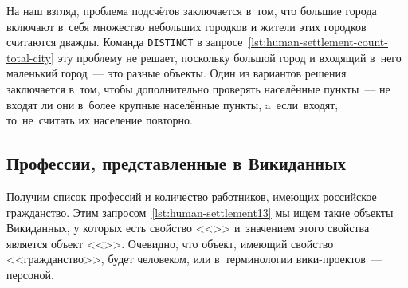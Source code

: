 На наш взгляд, проблема подсчётов заключается в~том, 
что большие города включают в~себя множество небольших городков и жители этих городков считаются дважды. 
Команда \lstinline|DISTINCT|%
%
%
%
%
в запросе~\ref{lst:human-settlement-count-total-city} 
эту проблему не решает, поскольку большой город и входящий в~него маленький город~--- это разные объекты. 
Один из вариантов решения заключается в~том, 
чтобы дополнительно проверять населённые пункты~---  
не входят ли они в~более крупные населённые пункты, 
a~если~входят, то~не~считать их население повторно. 



\subsection{Профессии, представленные в Викиданных}

Получим список профессий и количество работников, 
имеющих российское гражданство. 
Этим запросом~\ref{lst:human-settlement13} 
мы ищем такие объекты Викиданных, 
у которых есть свойство <<>> 
и~значением этого свойства является объект <<>>. 
Очевидно, что объект, имеющий свойство <<гражданство>>, будет человеком, 
или в~терминологии вики-проектов~--- персоной. 


